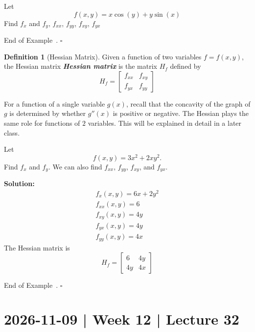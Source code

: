 \documentclass[10pt]{article}
\DeclareRobustCommand{\demph}[1]{%
  \ifmmode
  {\color{Blue}#1}%
  \else
  {\color{Blue}\bfseries\slshape #1}%
  \fi
}
\theoremstyle{definition}
\newtheorem{definition}[theorem]{Definition}
\newtheorem{example}[theorem]{Example}
\renewenvironment{example}
{\begin{oldexample}}
  {\par\smallskip\hfill   End of Example~\theexample. $\square$    \par\end{oldexample}}
\newcommand{\fl}{\noindent\textbf} %
\newcommand{\1}[1]{\textbf{1}_{\left[#1\right]}} %
\begin{document}
\begin{example}
  Let
  \begin{equation*}
    f(x,y) = x\cos(y)+y\sin(x)
  \end{equation*}
  Find $f_{x}$ and $f_{y}$, $f_{xx}$, $f_{yy}$, $f_{xy}$, $f_{yx}$
\end{example}




\begin{definition}[Hessian Matrix]
  Given a function of two variables $f=f(x,y)$, the \demph{Hessian matrix} is
  the matrix $H_{f}$ defined by
  \begin{equation*}
    H_{f} = \begin{bmatrix}
      f_{xx}&f_{xy}\\
      f_{yx}&f_{yy}
    \end{bmatrix}
  \end{equation*}
\end{definition}

For a function of a single variable $g(x)$, recall that the concavity of the
graph of $g$ is determined by whether $g''(x)$ is positive or negative. The
Hessian plays the same role for functions of $2$ variables. This will be
explained in detail in a later class.

\begin{example}
  Let
  \begin{equation*}
    f(x,y) = 3x^{2}+2xy^{2}.
  \end{equation*}
  Find $f_{x}$ and $f_{y}$. We can also find $f_{xx}$, $f_{yy}$, $f_{xy}$, and
  $f_{yx}$.

  \fl{Solution:}
  \begin{gather*}
    f_{x}(x,y) = 6x+2y^{2}\\
    f_{xx}(x,y) = 6\\
    f_{xy}(x,y) = 4y\\
    f_{yx}(x,y) = 4y\\
    f_{yy}(x,y) = 4x
  \end{gather*}
  The Hessian matrix is
  \begin{equation*}
    H_{f} =
    \begin{bmatrix}
      6&4y\\
      4y&4x
    \end{bmatrix}
  \end{equation*}
\end{example}
\newpage
\section{2026-11-09 | Week 12 | Lecture 32}
\end{document}
